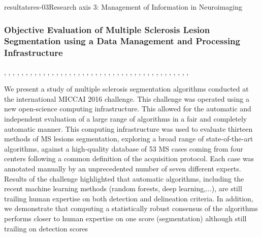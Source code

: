 \documentclass{ra2018}
\begin{document}
\begin{module}{resultats}{res-03}{Research axis 3: Management of Information in Neuroimaging}
\subsubsection{Objective Evaluation of Multiple Sclerosis Lesion Segmentation using a Data Management and Processing Infrastructure}
\begin{participants}
      ,
      ,
      ,
      ,
      ,
      ,
      ,
      ,
      ,
      ,
      ,
      ,
      ,
      ,
      ,
      ,
      ,
      ,
      ,
      ,
      ,
      ,
      ,
      ,
      ,
      ,
      ,
      ,
      ,
      ,
      ,
      ,
      ,
      ,
      ,
      ,
      ,
      ,
      ,
      ,
      ,
      ,
      ,
\end{participants}
We present a study of multiple sclerosis segmentation algorithms conducted at the international MICCAI 2016 challenge. This challenge was operated using a new open-science computing infrastructure. This allowed for the automatic and independent evaluation of a large range of algorithms in a fair and completely automatic manner. This computing infrastructure was used to evaluate thirteen methods of MS lesions segmentation, exploring a broad range of state-of-the-art algorithms, against a high-quality database of 53 MS cases coming from four centers following a common definition of the acquisition protocol. Each case was annotated manually by an unprecedented number of seven different experts. Results of the challenge highlighted that automatic algorithms, including the recent machine learning methods (random forests, deep learning,...), are still trailing human expertise on both detection and delineation criteria. In addition, we demonstrate that computing a statistically robust consensus of the algorithms performs closer to human expertise on one score (segmentation) although still trailing on detection scores~\cite{commowick:inserm-01847873}


\end{module}
\end{document}
